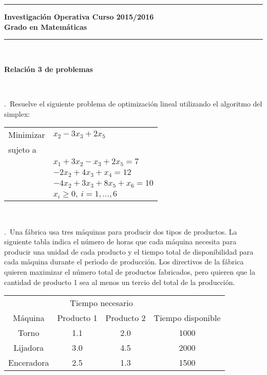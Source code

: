 \documentclass[11pt,a4paper,twoside]{article}
\newcounter{problem} \setcounter{problem}{1}
\newcommand{\ex}{\noindent {\sf \bf \theproblem}\addtocounter{problem}{1}.\ }
\begin{document}



\hrule
\bigskip
\textbf{Investigación Operativa   \hfill Curso 2015/2016\\
Grado en Matemáticas}
\bigskip
\hrule

\


\begin{center}  {\bf \large
Relaci\'{o}n 3 de problemas}
\end{center}

\



\ex Resuelve el siguiente problema de optimización lineal utilizando el algoritmo del simplex:

\begin{center}
\begin{tabular}{ll}
Minimizar & $x_2 - 3x_3 + 2x_5$ \\
sujeto a & \\
& $x_1 + 3x_2 - x_3 + 2x_5= 7$\\
& $-2x_2 + 4x_3 + x_4 = 12$\\
& $-4x_2 + 3x_3 + 8x_5 + x_6 = 10$\\
&$x_i\geq 0,\ i=1,\ldots,6$
\end{tabular}
\end{center}

\ 

\ex Una f\'abrica usa tres m\'aquinas para producir dos tipos de
productos. La siguiente tabla indica el n\'umero de horas que cada
m\'aquina necesita para producir una unidad de cada producto y el
tiempo total de disponibilidad para cada m\'aquina durante el
per\'{\i}odo de producci\'on. Los directivos de la f\'abrica quieren
maximizar el n\'umero total de productos fabricados, pero quieren
que la cantidad de producto 1 sea al menos un tercio del total de
la producci\'on.

\begin{center}
\begin{tabular}{|cccc|}
\hline { } & \multicolumn{2}{c}{\small Tiempo necesario} & { }\\
M\'aquina&Producto 1&Producto 2&{Tiempo disponible}\\ \hline
Torno&1.1&2.0&1000\\ Lijadora&3.0&4.5&2000\\
Enceradora&2.5&1.3&1500\\ \hline
\end{tabular}
\end{center}
\end{document}

